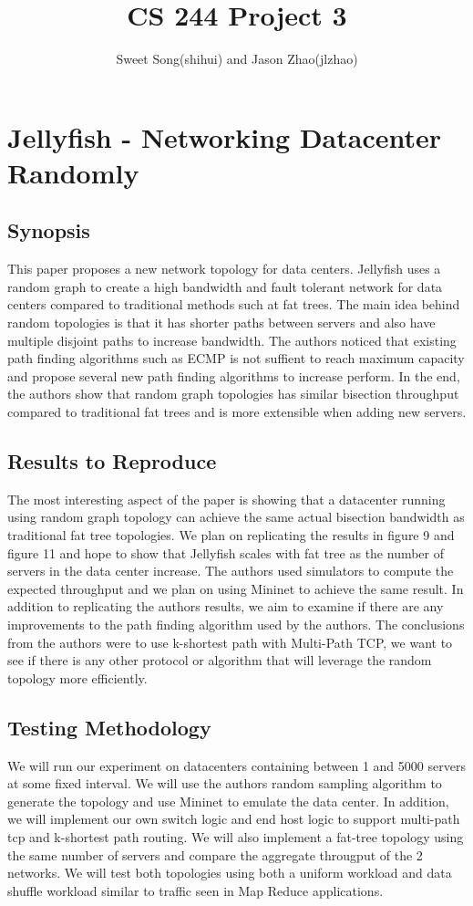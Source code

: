 \documentclass[letter paper, 11pt]{article}
\title{CS 244 Project 3}
\author{Sweet Song(shihui) and Jason Zhao(jlzhao)}
\date{}
\begin{document}
\maketitle{}
\section*{Jellyfish - Networking Datacenter Randomly}
\subsection*{Synopsis}
This paper proposes a new network topology for data centers. Jellyfish uses a random graph to create a high bandwidth and fault tolerant network for data centers compared to traditional methods such at fat trees. The main idea behind random topologies is that it has shorter paths between servers and also have multiple disjoint paths to increase bandwidth. The authors noticed that existing path finding algorithms such as ECMP is not suffient to reach maximum capacity and propose several new path finding algorithms to increase perform. In the end, the authors show that random graph topologies has similar bisection throughput compared to traditional fat trees and is more extensible when adding new servers.

\subsection*{Results to Reproduce}
The most interesting aspect of the paper is showing that a datacenter running using random graph topology can achieve the same actual bisection bandwidth as traditional fat tree topologies. We plan on replicating the results in figure 9 and figure 11 and hope to show that Jellyfish scales with fat tree as the number of servers in the data center increase. The authors used simulators to compute the expected throughput and we plan on using Mininet to achieve the same result. In addition to replicating the authors results, we aim to examine if there are any improvements to the path finding algorithm used by the authors. The conclusions from the authors were to use k-shortest path with Multi-Path TCP, we want to see if there is any other protocol or algorithm that will leverage the random topology more efficiently.

\subsection*{Testing Methodology}
We will run our experiment on datacenters containing between 1 and 5000 servers at some fixed interval. We will use the authors random sampling algorithm to generate the topology and use Mininet to emulate the data center. In addition, we will implement our own switch logic and end host logic to support multi-path tcp and k-shortest path routing. We will also implement a fat-tree topology using the same number of servers and compare the aggregate througput of the 2 networks. We will test both topologies using both a uniform workload and data shuffle workload similar to traffic seen in Map Reduce applications. 
\end{document}
